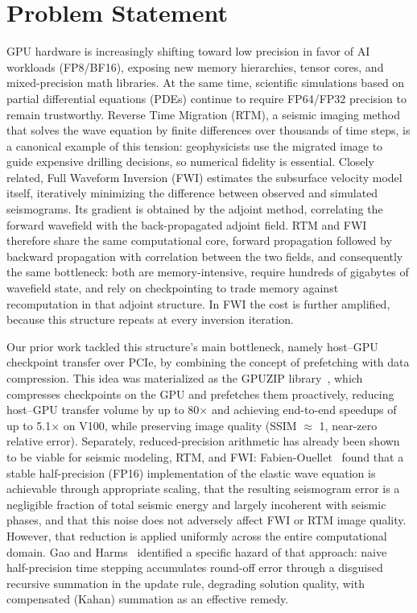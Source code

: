 \documentclass[12pt,a4paper]{article}
\begin{document}
\newpage

\section{Problem Statement}

GPU hardware is increasingly shifting toward low precision in favor of AI
workloads (FP8/BF16), exposing new memory hierarchies, tensor cores, and
mixed-precision math libraries. At the same time, scientific simulations
based on partial differential equations (PDEs) continue to require FP64/FP32
precision to remain trustworthy. Reverse Time Migration (RTM), a seismic
imaging method that solves the wave equation by finite differences over
thousands of time steps, is a canonical example of this tension:
geophysicists use the migrated image to guide expensive drilling decisions,
so numerical fidelity is essential. Closely related, Full Waveform Inversion
(FWI) estimates the subsurface velocity model itself, iteratively minimizing
the difference between observed and simulated seismograms. Its gradient is
obtained by the adjoint method, correlating the forward wavefield with the
back-propagated adjoint field. RTM and FWI therefore share the same
computational core, forward propagation followed by backward propagation
with correlation between the two fields, and consequently the same
bottleneck: both are memory-intensive, require hundreds of gigabytes of
wavefield state, and rely on checkpointing to trade memory against
recomputation in that adjoint structure. In FWI the cost is further
amplified, because this structure repeats at every inversion iteration.

Our prior work tackled this structure's main bottleneck, namely host--GPU
checkpoint transfer over PCIe, by combining the concept of prefetching with
data compression. This idea was materialized as the GPUZIP
library~\cite{maltempi2025checkpointing,gpuzip}, which compresses checkpoints
on the GPU and prefetches them proactively, reducing host--GPU transfer
volume by up to 80$\times$ and achieving end-to-end speedups of up to
5.1$\times$ on V100, while preserving image quality (SSIM $\approx$ 1,
near-zero relative error). Separately, reduced-precision arithmetic has
already been shown to be viable for seismic modeling, RTM, and FWI:
Fabien-Ouellet~\cite{fabienouellet2020half} found that a stable
half-precision (FP16) implementation of the elastic wave equation is
achievable through appropriate scaling, that the resulting seismogram error
is a negligible fraction of total seismic energy and largely incoherent with
seismic phases, and that this noise does not adversely affect FWI or RTM
image quality. However, that reduction is applied uniformly across the
entire computational domain. Gao and Harms~\cite{gao2023half} identified a
specific hazard of that approach: naive half-precision time stepping
accumulates round-off error through a disguised recursive summation in the
update rule, degrading solution quality, with compensated (Kahan) summation
as an effective remedy.
\end{document}
